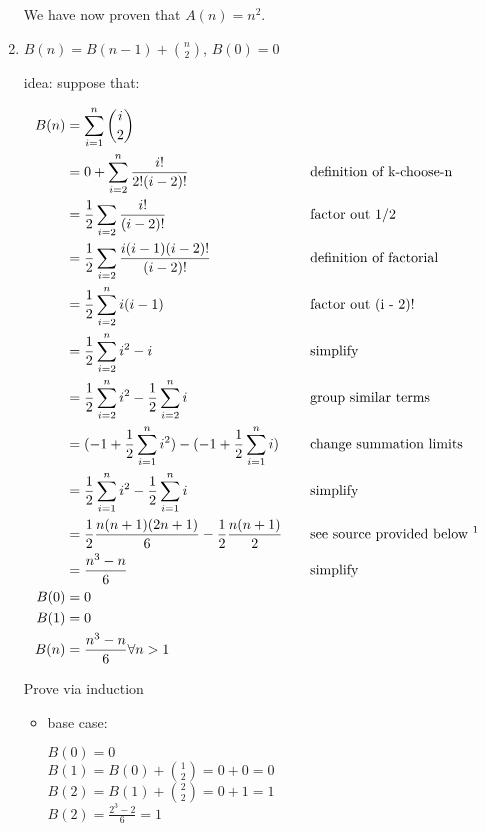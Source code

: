 \documentclass[11pt, letterpaper]{article}
\begin{document}
\begin{enumerate}[label=(\alph*)]
We have now proven that $A(n) = n^2$.

\bigbreak
\bigbreak

\pagebreak
\item $B(n) = B(n - 1) + {n \choose 2}$, $B(0) = 0$

idea: suppose that:

\begin{alignat*}{2}
B(n) &= \sum_{i = 1}^n {i \choose 2} &\quad \\
&= 0 + \sum_{i = 2}^n \frac{i!}{2!(i - 2)!} &\quad &\text{definition of k-choose-n} \\
&= \frac{1}{2} \sum_{i = 2} \frac{i!}{(i - 2)!} &\quad &\text{factor out 1/2} \\
&= \frac{1}{2} \sum_{i = 2} \frac{i(i - 1)(i - 2)!}{(i - 2)!} &\quad &\text{definition of factorial} \\
&= \frac{1}{2} \sum_{i = 2}^n i(i - 1) &\quad &\text{factor out (i - 2)!} \\
&= \frac{1}{2} \sum_{i = 2}^n i^2 - i &\quad &\text{simplify} \\
&= \frac{1}{2} \sum_{i = 2}^n i^2 - \frac{1}{2}\sum_{i = 2}^n i &\quad &\text{group similar terms} \\
&= (-1 + \frac{1}{2} \sum_{i = 1}^n i^2) - (-1 + \frac{1}{2}\sum_{i = 1}^n i) &\quad &\text{change summation limits} \\
&= \frac{1}{2} \sum_{i = 1}^n i^2 - \frac{1}{2} \sum_{i = 1}^n i &\quad &\text{simplify} \\
&= \frac{1}{2}\frac{n(n + 1)(2n + 1)}{6} - \frac{1}{2} \frac{n(n + 1)}{2} &\quad &\text{see source provided below 
\footnotemark} \\
&= \frac{n^3 - n}{6} &\quad &\text{simplify} \\
B(0) &= 0 \\
B(1) &= 0 \\
B(n) &= \frac{n^3 - n}{6} \forall n > 1 \\
\end{alignat*}


\begin{center}
Prove via induction
\end{center}

\begin{itemize}
\item base case: 

$B(0) = 0$ \\
$B(1) = B(0) + {1 \choose 2} = 0 + 0 = 0$ \\
$B(2) = B(1) + {2 \choose 2} = 0 + 1 = 1$ \\
$B(2) = \frac{2^3 - 2}{6} = 1$ \\


\end{itemize}
\end{enumerate}
\end{document}
